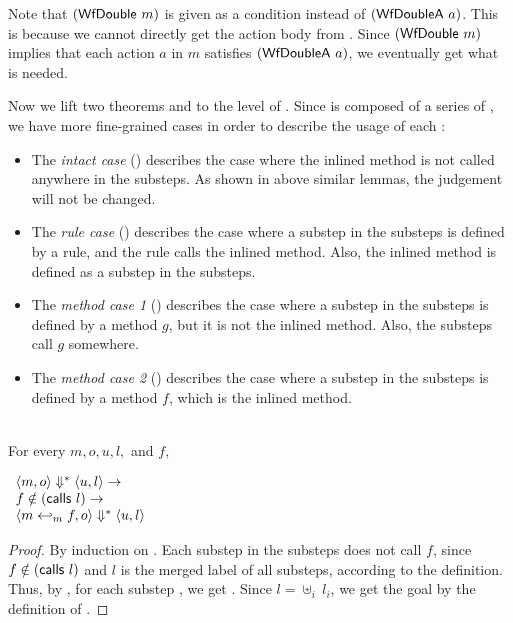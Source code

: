 Note that $(\textsf{WfDouble}\ m)$ is given as a condition instead of
$(\textsf{WfDoubleA}\ a)$. This is because we cannot directly get the action
body from \Substep{}. Since $(\textsf{WfDouble}\ m)$ implies that each action
$a$ in $m$ satisfies $(\textsf{WfDoubleA}\ a)$, we eventually get what is
needed.

Now we lift two theorems  and
 to the level of \Substeps{}. Since
\Substeps{} is composed of a series of \Substep{}, we have more
fine-grained cases in order to describe the usage of each \Substep{}:
\begin{itemize}
\item The \emph{intact case} () describes
  the case where the inlined method is not called anywhere in the
  substeps. As shown in above similar lemmas, the judgement will not
  be changed.
\item The \emph{rule case} () describes the
  case where a substep in the substeps is defined by a rule, and the
  rule calls the inlined method. Also, the inlined method is defined
  as a substep in the substeps.
\item The \emph{method case 1} ()
  describes the case where a substep in the substeps is defined by a
  method $g$, but it is not the inlined method. Also, the substeps
  call $g$ somewhere.
\item The \emph{method case 2} ()
  describes the case where a substep in the substeps is defined by a
  method $f$, which is the inlined method.
\end{itemize}

\begin{lemma}
  \label{lem-inlinedmm-intact}
  \mbox{}\\
  For every $m, o, u, l,$ and $f,$
  \begin{center}
    \begin{math}
      \begin{array}{l}
        \langle m, o \rangle \Downarrow^{\ast} \langle u, l \rangle \to \\
        f \notin (\textsf{calls}\ l) \to \\
        \langle m \hookleftarrow_{m}{} f, o \rangle \Downarrow^{\ast} \langle u, l \rangle
      \end{array}
    \end{math}
  \end{center}
\end{lemma}
\begin{proof}
  By induction on \Substeps{}. Each substep in the substeps does not
  call $f$, since $f \notin (\textsf{calls}\ l)$ and $l$ is the merged label
  of all substeps, according to the definition. Thus, by
  , for each substep
  , we get
  . Since $l = \uplus_i\ l_i$,
  we get the goal by the definition of \Substeps{}.
\end{proof}

